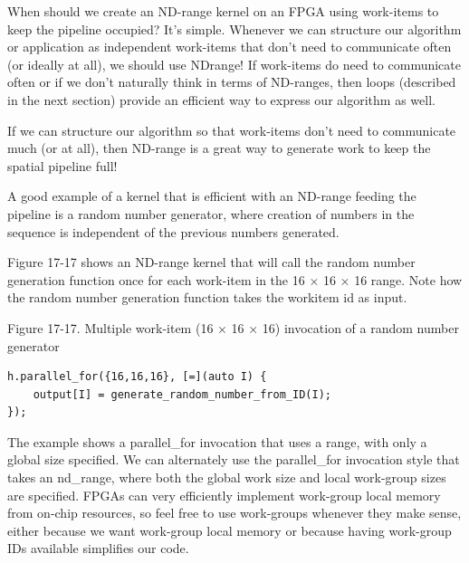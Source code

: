 When should we create an ND-range kernel on an FPGA using work-items to keep the pipeline occupied? It’s simple. Whenever we can structure our algorithm or application as independent work-items that don’t need to communicate often (or ideally at all), we should use NDrange! If work-items do need to communicate often or if we don’t naturally think in terms of ND-ranges, then loops (described in the next section) provide an efficient way to express our algorithm as well.\par

\begin{tcolorbox}[colback=red!5!white,colframe=red!75!black]
If we can structure our algorithm so that work-items don’t need to communicate much (or at all), then ND-range is a great way to generate work to keep the spatial pipeline full!
\end{tcolorbox}

A good example of a kernel that is efficient with an ND-range feeding the pipeline is a random number generator, where creation of numbers in the sequence is independent of the previous numbers generated.\par

Figure 17-17 shows an ND-range kernel that will call the random number generation function once for each work-item in the 16 × 16 × 16 range. Note how the random number generation function takes the workitem id as input.\par

\hspace*{\fill} \par %
Figure 17-17. Multiple work-item (16 × 16 × 16) invocation of a random number generator
\begin{lstlisting}[caption={}]
h.parallel_for({16,16,16}, [=](auto I) {
	output[I] = generate_random_number_from_ID(I);
});
\end{lstlisting}

The example shows a parallel\_for invocation that uses a range, with only a global size specified. We can alternately use the parallel\_for invocation style that takes an nd\_range, where both the global work size and local work-group sizes are specified. FPGAs can very efficiently implement work-group local memory from on-chip resources, so feel free to use work-groups whenever they make sense, either because we want work-group local memory or because having work-group IDs available simplifies our code.\par

